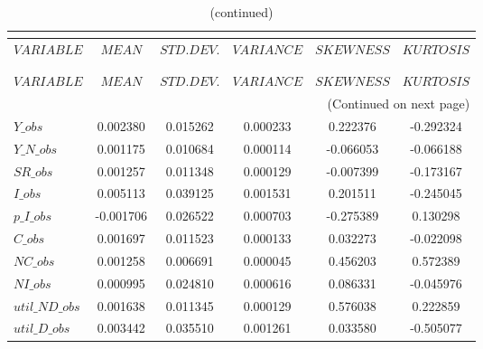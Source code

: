  
\begin{center}
\begin{longtable}{lccccc} 
\caption{MOMENTS OF SIMULATED VARIABLES}\\
 \label{Table:sim_moments}\\
\toprule 
$VARIABLE       $	 & 	 $            MEAN$	 & 	 $       STD. DEV.$	 & 	 $        VARIANCE$	 & 	 $        SKEWNESS$	 & 	 $        KURTOSIS$\\
\midrule \endfirsthead 
\caption{(continued)}\\
 \toprule \\ 
$VARIABLE       $	 & 	 $            MEAN$	 & 	 $       STD. DEV.$	 & 	 $        VARIANCE$	 & 	 $        SKEWNESS$	 & 	 $        KURTOSIS$\\
\midrule \endhead 
\midrule \multicolumn{6}{r}{(Continued on next page)} \\ \bottomrule \endfoot 
\bottomrule \endlastfoot 
$Y\_obs         $	 & 	        0.002380	 & 	        0.015262	 & 	        0.000233	 & 	        0.222376	 & 	       -0.292324 \\ 
$Y\_N\_obs      $	 & 	        0.001175	 & 	        0.010684	 & 	        0.000114	 & 	       -0.066053	 & 	       -0.066188 \\ 
$SR\_obs        $	 & 	        0.001257	 & 	        0.011348	 & 	        0.000129	 & 	       -0.007399	 & 	       -0.173167 \\ 
$I\_obs         $	 & 	        0.005113	 & 	        0.039125	 & 	        0.001531	 & 	        0.201511	 & 	       -0.245045 \\ 
$p\_I\_obs      $	 & 	       -0.001706	 & 	        0.026522	 & 	        0.000703	 & 	       -0.275389	 & 	        0.130298 \\ 
$C\_obs         $	 & 	        0.001697	 & 	        0.011523	 & 	        0.000133	 & 	        0.032273	 & 	       -0.022098 \\ 
$NC\_obs        $	 & 	        0.001258	 & 	        0.006691	 & 	        0.000045	 & 	        0.456203	 & 	        0.572389 \\ 
$NI\_obs        $	 & 	        0.000995	 & 	        0.024810	 & 	        0.000616	 & 	        0.086331	 & 	       -0.045976 \\ 
$util\_ND\_obs  $	 & 	        0.001638	 & 	        0.011345	 & 	        0.000129	 & 	        0.576038	 & 	        0.222859 \\ 
$util\_D\_obs   $	 & 	        0.003442	 & 	        0.035510	 & 	        0.001261	 & 	        0.033580	 & 	       -0.505077 \\ 

\end{longtable}
\end{center}
